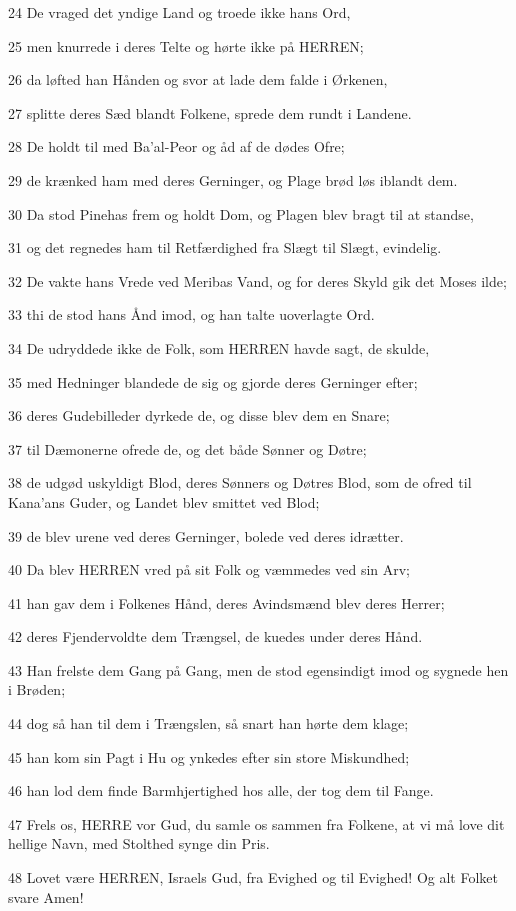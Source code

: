 \par 24 De vraged det yndige Land og troede ikke hans Ord,
\par 25 men knurrede i deres Telte og hørte ikke på HERREN;
\par 26 da løfted han Hånden og svor at lade dem falde i Ørkenen,
\par 27 splitte deres Sæd blandt Folkene, sprede dem rundt i Landene.
\par 28 De holdt til med Ba'al-Peor og åd af de dødes Ofre;
\par 29 de krænked ham med deres Gerninger, og Plage brød løs iblandt dem.
\par 30 Da stod Pinehas frem og holdt Dom, og Plagen blev bragt til at standse,
\par 31 og det regnedes ham til Retfærdighed fra Slægt til Slægt, evindelig.
\par 32 De vakte hans Vrede ved Meribas Vand, og for deres Skyld gik det Moses ilde;
\par 33 thi de stod hans Ånd imod, og han talte uoverlagte Ord.
\par 34 De udryddede ikke de Folk, som HERREN havde sagt, de skulde,
\par 35 med Hedninger blandede de sig og gjorde deres Gerninger efter;
\par 36 deres Gudebilleder dyrkede de, og disse blev dem en Snare;
\par 37 til Dæmonerne ofrede de, og det både Sønner og Døtre;
\par 38 de udgød uskyldigt Blod, deres Sønners og Døtres Blod, som de ofred til Kana'ans Guder, og Landet blev smittet ved Blod;
\par 39 de blev urene ved deres Gerninger, bolede ved deres idrætter.
\par 40 Da blev HERREN vred på sit Folk og væmmedes ved sin Arv;
\par 41 han gav dem i Folkenes Hånd, deres Avindsmænd blev deres Herrer;
\par 42 deres Fjendervoldte dem Trængsel, de kuedes under deres Hånd.
\par 43 Han frelste dem Gang på Gang, men de stod egensindigt imod og sygnede hen i Brøden;
\par 44 dog så han til dem i Trængslen, så snart han hørte dem klage;
\par 45 han kom sin Pagt i Hu og ynkedes efter sin store Miskundhed;
\par 46 han lod dem finde Barmhjertighed hos alle, der tog dem til Fange.
\par 47 Frels os, HERRE vor Gud, du samle os sammen fra Folkene, at vi må love dit hellige Navn, med Stolthed synge din Pris.
\par 48 Lovet være HERREN, Israels Gud, fra Evighed og til Evighed! Og alt Folket svare Amen!

